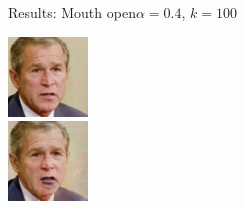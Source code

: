 \documentclass[11pt]{beamer}
\begin{document}
\begin{frame}{Results: Mouth open}{$\alpha=0.4$, $k=100$}
\begin{minipage}{81px}
	\end{minipage}%
	\begin{minipage}{81px}
		\includegraphics[width=80px]{../pictures/outputs/start-imgs/Bush.png}\\
		\includegraphics[width=80px]{../pictures/outputs/mouth_open_alpha0.4_k100/Bush.png}
	\end{minipage}
\end{frame}

\end{document}
